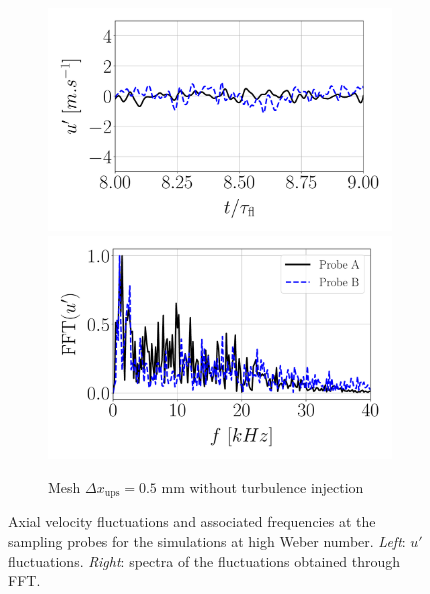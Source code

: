 \begin{figure}[ht]
\begin{subfigure}[b]{1.0\textwidth}
	\centering
   \includegraphics[scale=0.28]{./part2_developments/figures_ch5_resolved_JICF/results_ics_mesh_convergence_probes/up_dx0p5_no_turb.pdf}
   \includegraphics[scale=0.28]{./part2_developments/figures_ch5_resolved_JICF/results_ics_mesh_convergence_probes/spectra_linear_scale_dx0p5_no_turb.pdf}
   \vspace*{-0.10in}
   \caption{Mesh $\Delta x_\mathrm{ups} = 0.5$ mm without turbulence injection}
   \label{fig:ics_mesh_independency_study_probes_dx0p5_no_turb}
\end{subfigure}

\caption[Axial velocity fluctuations and associated frequencies at the sampling probes for the simulations at high Weber number.]{
Axial velocity fluctuations and associated frequencies at the sampling probes for the simulations at high Weber number. \textsl{Left}: $u'$ fluctuations. \textsl{Right}: spectra of the fluctuations obtained through FFT.}
\label{fig:ics_mesh_independency_study_probes}
\end{figure}

